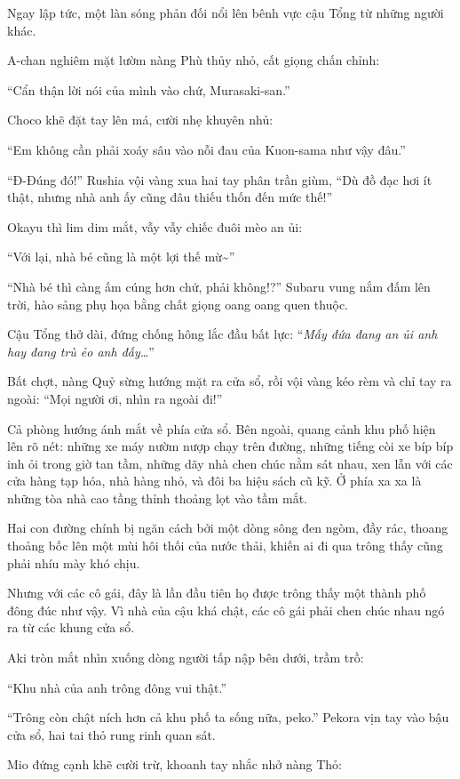 \documentclass[../main.tex]{subfiles}
\begin{document}
Ngay lập tức, một làn sóng phản đối nổi lên bênh vực cậu Tổng từ những người khác.

A-chan nghiêm mặt lườm nàng Phù thủy nhỏ, cất giọng chấn chỉnh:

``Cẩn thận lời nói của mình vào chứ, Murasaki-san.''

Choco khẽ đặt tay lên má, cười nhẹ khuyên nhủ:

``Em không cần phải xoáy sâu vào nỗi đau của Kuon-sama như vậy đâu.''

``Đ-Đúng đó!'' Rushia vội vàng xua hai tay phân trần giùm, ``Dù đồ đạc hơi ít thật, nhưng nhà anh ấy cũng đâu thiếu thốn đến mức thế!''

Okayu thì lim dim mắt, vẫy vẫy chiếc đuôi mèo an ủi:

``Với lại, nhà bé cũng là một lợi thế mừ\~{}''

``Nhà bé thì càng ấm cúng hơn chứ, phải không!?'' Subaru vung nắm đấm lên trời, hào sảng phụ họa bằng chất giọng oang oang quen thuộc.

Cậu Tổng thở dài, đứng chống hông lắc đầu bất lực: ``\textit{Mấy đứa đang an ủi anh hay đang trù ẻo anh đấy\dots}''

Bất chợt, nàng Quỷ sừng hướng mặt ra cửa sổ, rồi vội vàng kéo rèm và chỉ tay ra ngoài: ``Mọi người ơi, nhìn ra ngoài đi!''

Cả phòng hướng ánh mắt về phía cửa sổ. Bên ngoài, quang cảnh khu phố hiện lên rõ nét: những xe máy nườm nượp chạy trên đường, những tiếng còi xe bíp bíp inh ỏi trong giờ tan tầm, những dãy nhà chen chúc nằm sát nhau, xen lẫn với các cửa hàng tạp hóa, nhà hàng nhỏ, và đôi ba hiệu sách cũ kỹ. Ở phía xa xa là những tòa nhà cao tầng thỉnh thoảng lọt vào tầm mắt.

Hai con đường chính bị ngăn cách bởi một dòng sông đen ngòm, đầy rác, thoang thoảng bốc lên một mùi hôi thối của nước thải, khiến ai đi qua trông thấy cũng phải nhíu mày khó chịu.

Nhưng với các cô gái, đây là lần đầu tiên họ được trông thấy một thành phố đông đúc như vậy. Vì nhà của cậu khá chật, các cô gái phải chen chúc nhau ngó ra từ các khung cửa sổ.

Aki tròn mắt nhìn xuống dòng người tấp nập bên dưới, trầm trồ:

``Khu nhà của anh trông đông vui thật.''

``Trông còn chật ních hơn cả khu phố ta sống nữa, peko.'' Pekora vịn tay vào bậu cửa sổ, hai tai thỏ rung rinh quan sát.

Mio đứng cạnh khẽ cười trừ, khoanh tay nhắc nhở nàng Thỏ:
\end{document}
